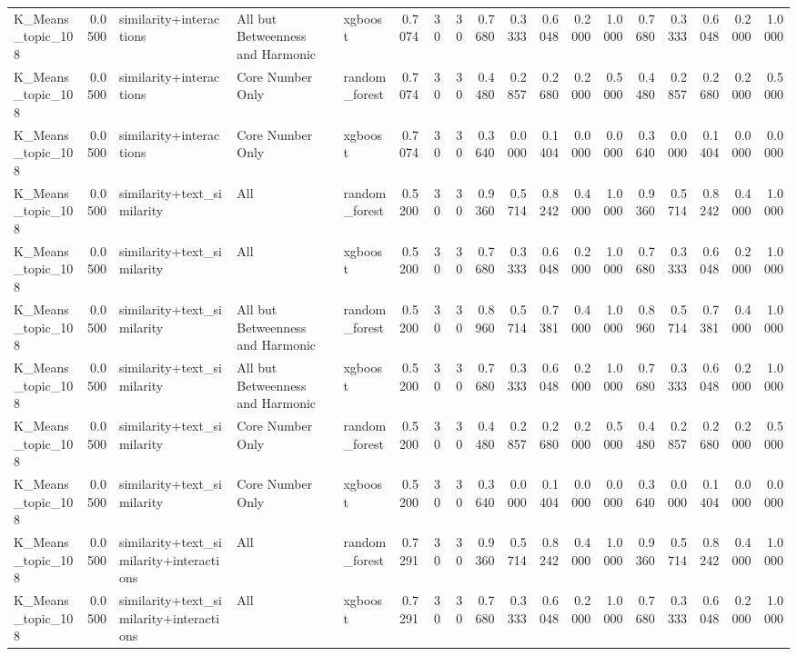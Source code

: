 \begin{tabular}{lrlllrrrrrrrrrrrrr}
K_Means_topic_108 & 0.0500 & similarity+interactions & All but Betweenness and Harmonic & xgboost & 0.7074 & 30 & 30 & 0.7680 & 0.3333 & 0.6048 & 0.2000 & 1.0000 & 0.7680 & 0.3333 & 0.6048 & 0.2000 & 1.0000 \\
K_Means_topic_108 & 0.0500 & similarity+interactions & Core Number Only & random_forest & 0.7074 & 30 & 30 & 0.4480 & 0.2857 & 0.2680 & 0.2000 & 0.5000 & 0.4480 & 0.2857 & 0.2680 & 0.2000 & 0.5000 \\
K_Means_topic_108 & 0.0500 & similarity+interactions & Core Number Only & xgboost & 0.7074 & 30 & 30 & 0.3640 & 0.0000 & 0.1404 & 0.0000 & 0.0000 & 0.3640 & 0.0000 & 0.1404 & 0.0000 & 0.0000 \\
K_Means_topic_108 & 0.0500 & similarity+text_similarity & All & random_forest & 0.5200 & 30 & 30 & 0.9360 & 0.5714 & 0.8242 & 0.4000 & 1.0000 & 0.9360 & 0.5714 & 0.8242 & 0.4000 & 1.0000 \\
K_Means_topic_108 & 0.0500 & similarity+text_similarity & All & xgboost & 0.5200 & 30 & 30 & 0.7680 & 0.3333 & 0.6048 & 0.2000 & 1.0000 & 0.7680 & 0.3333 & 0.6048 & 0.2000 & 1.0000 \\
K_Means_topic_108 & 0.0500 & similarity+text_similarity & All but Betweenness and Harmonic & random_forest & 0.5200 & 30 & 30 & 0.8960 & 0.5714 & 0.7381 & 0.4000 & 1.0000 & 0.8960 & 0.5714 & 0.7381 & 0.4000 & 1.0000 \\
K_Means_topic_108 & 0.0500 & similarity+text_similarity & All but Betweenness and Harmonic & xgboost & 0.5200 & 30 & 30 & 0.7680 & 0.3333 & 0.6048 & 0.2000 & 1.0000 & 0.7680 & 0.3333 & 0.6048 & 0.2000 & 1.0000 \\
K_Means_topic_108 & 0.0500 & similarity+text_similarity & Core Number Only & random_forest & 0.5200 & 30 & 30 & 0.4480 & 0.2857 & 0.2680 & 0.2000 & 0.5000 & 0.4480 & 0.2857 & 0.2680 & 0.2000 & 0.5000 \\
K_Means_topic_108 & 0.0500 & similarity+text_similarity & Core Number Only & xgboost & 0.5200 & 30 & 30 & 0.3640 & 0.0000 & 0.1404 & 0.0000 & 0.0000 & 0.3640 & 0.0000 & 0.1404 & 0.0000 & 0.0000 \\
K_Means_topic_108 & 0.0500 & similarity+text_similarity+interactions & All & random_forest & 0.7291 & 30 & 30 & 0.9360 & 0.5714 & 0.8242 & 0.4000 & 1.0000 & 0.9360 & 0.5714 & 0.8242 & 0.4000 & 1.0000 \\
K_Means_topic_108 & 0.0500 & similarity+text_similarity+interactions & All & xgboost & 0.7291 & 30 & 30 & 0.7680 & 0.3333 & 0.6048 & 0.2000 & 1.0000 & 0.7680 & 0.3333 & 0.6048 & 0.2000 & 1.0000 \\

\end{tabular}
